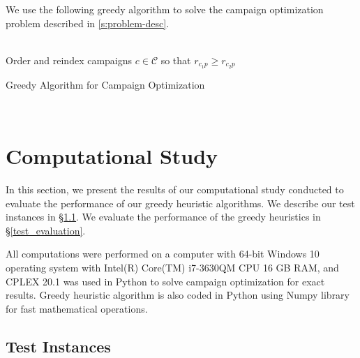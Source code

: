 \documentclass[11pt]{article}
\begin{document}
We use the following greedy algorithm to solve the campaign optimization problem described in \ref{s:problem-desc}.

\begin{algorithm}[H]
\\
Order and reindex campaigns $c\in\mathcal{C}$ so that $r_{c_{1}p} \geq r_{c_{2}p}$
\\
\;
\caption{Greedy Algorithm for Campaign Optimization}
\label{algo:change}
\end{algorithm}\\


\section{Computational Study} \label{num-analysis}

In this section, we present the results of our computational study conducted to evaluate the performance of our greedy heuristic algorithms. We describe our test instances in \S \ref{test_instances}. We evaluate the performance of the greedy heuristics in \S \ref{test_evaluation}.

All computations were performed on a computer with 64-bit Windows 10 operating system with Intel(R) Core(TM) i7-3630QM CPU 16 GB RAM, and CPLEX 20.1 was used in Python to solve campaign optimization for exact results. Greedy heuristic algorithm is also coded in Python using Numpy library for fast mathematical operations.

\subsection{Test Instances} \label{test_instances}
\end{document}
